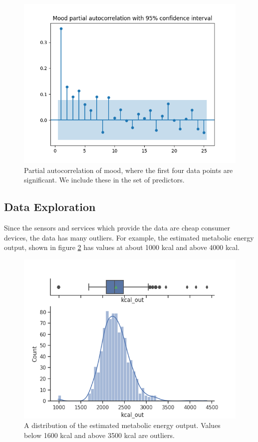 \documentclass[conference]{IEEEtran}
\begin{document}
\begin{figure}[htbp]
\begin{center}
\includegraphics[width=1\linewidth]{figs/partial_autocorrelation_025lags_Mood.png}
\caption[]{Partial autocorrelation of mood, where the first four data points are significant. We include these in the set of predictors.}
\label{fig:partial_auto_corr}
\end{center}
\end{figure}




\subsection{Data Exploration}
Since the sensors and services which provide the data are cheap consumer devices, the data has many outliers.
For example, the estimated metabolic energy output, shown in figure \ref{fig:kcal_out} has values at about 1000 kcal and above 4000 kcal.


\begin{figure}[htbp]
\begin{center}
\includegraphics[width=1\linewidth]{figs/kcal_out.png}
\caption{A distribution of the estimated metabolic energy output. Values below 1600 kcal and above 3500 kcal are outliers.}
\label{fig:kcal_out}
\end{center}
\end{figure}
\end{document}
